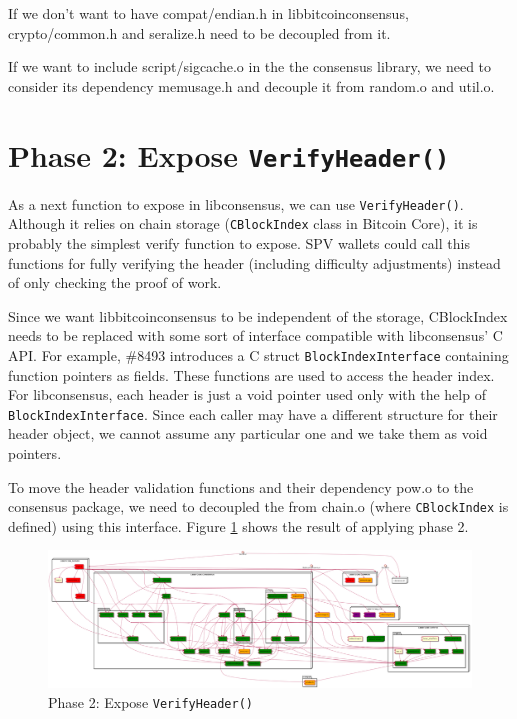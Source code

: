 \documentclass[11pt]{article}
\begin{document}
If we don't want to have compat/endian.h in libbitcoinconsensus,
crypto/common.h and seralize.h need to be decoupled from it.

If we want to include script/sigcache.o in the the consensus library,
we need to consider its dependency memusage.h and decouple it from
random.o and util.o.

\newpage
\section{Phase 2: Expose \texttt{VerifyHeader()}}
\label{sec-3}

As a next function to expose in libconsensus, we can use
\texttt{VerifyHeader()}. Although it relies on chain storage (\texttt{CBlockIndex}
class in Bitcoin Core), it is probably the simplest verify function to
expose. SPV wallets could call this functions for fully verifying the
header (including difficulty adjustments) instead of only checking the proof of work.

Since we want libbitcoinconsensus to be independent of the storage,
CBlockIndex needs to be replaced with some sort of interface
compatible with libconsensus' C API. For example, \#8493 introduces a C
struct \texttt{BlockIndexInterface} containing function pointers as fields. These functions are
used to access the header index. For libconsensus, each header is just
a void pointer used only with the help of \texttt{BlockIndexInterface}. Since
each caller may have a different structure for their header object, we
cannot assume any particular one and we take them as void pointers.

To move the header validation functions and their dependency pow.o to
the consensus package, we need to decoupled the from chain.o (where
\texttt{CBlockIndex} is defined) using this interface. Figure
\ref{pic_5_phase2} shows the result of applying phase 2.

\begin{figure}[htb]
\centering
\includegraphics[width=.9\linewidth]{./img/5_phase2_libconsensus.png}
\caption{\label{pic_5_phase2}Phase 2: Expose \texttt{VerifyHeader()}}
\end{figure}
\end{document}

